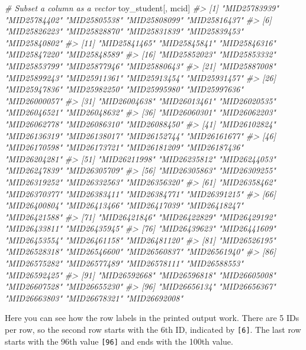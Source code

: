 \documentclass[
]{book}
\newenvironment{Shaded}{\begin{snugshade}}{\end{snugshade}}
\newcommand{\CommentTok}[1]{\textcolor[rgb]{0.56,0.35,0.01}{\textit{#1}}}
\newcommand{\NormalTok}[1]{#1}
\begin{document}
\begin{Shaded}
\begin{Highlighting}[]
\CommentTok{\# Subset a column as a vector}
\NormalTok{toy\_student[, mcid]}
\CommentTok{\#\textgreater{}   [1] "MID25783939" "MID25784402" "MID25805538" "MID25808099" "MID25816437"}
\CommentTok{\#\textgreater{}   [6] "MID25826223" "MID25828870" "MID25831839" "MID25839453" "MID25840802"}
\CommentTok{\#\textgreater{}  [11] "MID25841465" "MID25845841" "MID25846316" "MID25847220" "MID25848589"}
\CommentTok{\#\textgreater{}  [16] "MID25852023" "MID25853332" "MID25853799" "MID25877946" "MID25880643"}
\CommentTok{\#\textgreater{}  [21] "MID25887008" "MID25899243" "MID25911361" "MID25913454" "MID25931457"}
\CommentTok{\#\textgreater{}  [26] "MID25947836" "MID25982250" "MID25995980" "MID25997636" "MID26000057"}
\CommentTok{\#\textgreater{}  [31] "MID26004638" "MID26013461" "MID26020535" "MID26046521" "MID26048632"}
\CommentTok{\#\textgreater{}  [36] "MID26060301" "MID26062203" "MID26062778" "MID26086310" "MID26088450"}
\CommentTok{\#\textgreater{}  [41] "MID26102824" "MID26136319" "MID26138017" "MID26152744" "MID26161677"}
\CommentTok{\#\textgreater{}  [46] "MID26170598" "MID26173721" "MID26181209" "MID26187436" "MID26204281"}
\CommentTok{\#\textgreater{}  [51] "MID26211998" "MID26235812" "MID26244053" "MID26247839" "MID26305709"}
\CommentTok{\#\textgreater{}  [56] "MID26305863" "MID26309255" "MID26319252" "MID26332563" "MID26356320"}
\CommentTok{\#\textgreater{}  [61] "MID26358462" "MID26370377" "MID26383411" "MID26384771" "MID26391215"}
\CommentTok{\#\textgreater{}  [66] "MID26400804" "MID26413466" "MID26417039" "MID26418247" "MID26421588"}
\CommentTok{\#\textgreater{}  [71] "MID26421846" "MID26422829" "MID26429192" "MID26433811" "MID26435945"}
\CommentTok{\#\textgreater{}  [76] "MID26439623" "MID26441609" "MID26453554" "MID26461158" "MID26481120"}
\CommentTok{\#\textgreater{}  [81] "MID26526195" "MID26528318" "MID26546600" "MID26560837" "MID26561940"}
\CommentTok{\#\textgreater{}  [86] "MID26575282" "MID26577489" "MID26578111" "MID26588553" "MID26592425"}
\CommentTok{\#\textgreater{}  [91] "MID26592668" "MID26596818" "MID26605008" "MID26607528" "MID26655230"}
\CommentTok{\#\textgreater{}  [96] "MID26656134" "MID26656367" "MID26663803" "MID26678321" "MID26692008"}
\end{Highlighting}
\end{Shaded}

Here you can see how the row labels in the printed output work. There are 5 IDs per row, so the second row starts with the 6th ID, indicated by \texttt{{[}6{]}}. The last row starts with the 96th value \texttt{{[}96{]}} and ends with the 100th value.
\end{document}
